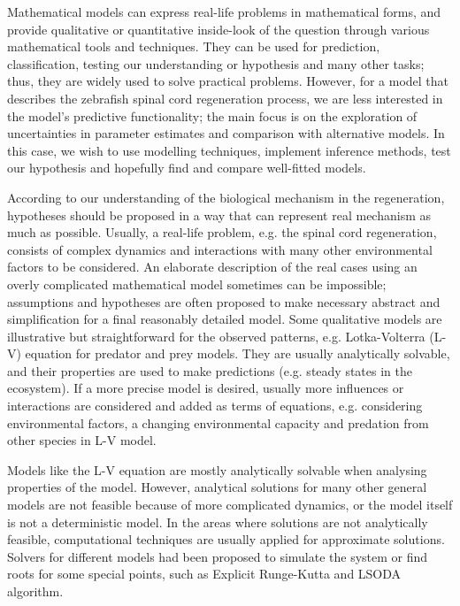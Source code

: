 
Mathematical models can express real-life problems in mathematical forms, and provide qualitative or quantitative inside-look of the question through various mathematical tools and techniques. They can be used for prediction, classification, testing our understanding or hypothesis and many other tasks; thus, they are widely used to solve practical problems. However, for a model that describes the zebrafish spinal cord regeneration process, we are less interested in the model's predictive functionality; the main focus is on the exploration of uncertainties in parameter estimates and comparison with alternative models. In this case, we wish to use modelling techniques, implement inference methods, test our hypothesis and hopefully find and compare well-fitted models.

According to our understanding of the biological mechanism in the regeneration, hypotheses should be proposed in a way that can represent real mechanism as much as possible. Usually, a real-life problem, e.g. the spinal cord regeneration, consists of complex dynamics and interactions with many other environmental factors to be considered. An elaborate description of the real cases using an overly complicated mathematical model sometimes can be impossible; assumptions and hypotheses are often proposed to make necessary abstract and simplification for a final reasonably detailed model. Some qualitative models are illustrative but straightforward for the observed patterns, e.g. Lotka-Volterra (L-V) equation for predator and prey models. They are usually analytically solvable, and their properties are used to make predictions (e.g. steady states in the ecosystem). If a more precise model is desired, usually more influences or interactions are considered and added as terms of equations, e.g. considering environmental factors, a changing environmental capacity and predation from other species in L-V model.

Models like the L-V equation are mostly analytically solvable when analysing properties of the model. However, analytical solutions for many other general models are not feasible because of more complicated dynamics, or the model itself is not a deterministic model. In the areas where solutions are not analytically feasible, computational techniques are usually applied for approximate solutions. Solvers for different models had been proposed to simulate the system or find roots for some special points, such as Explicit Runge-Kutta \cite{dormand1980family} and LSODA algorithm.

